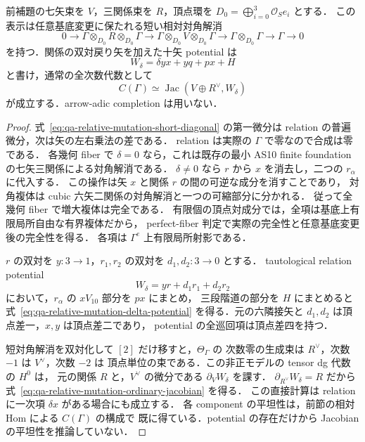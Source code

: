 \begin{proposition}
\label{prop:qa-relative-mutation-ordinary-jacobian}
前補題の七矢束を $V$，三関係束を $R$，頂点環を
$D_0=\bigoplus_{i=0}^3\mathcal O_Se_i$ とする．
この表示は任意基底変更に保たれる短い相対対角解消
\[
 0\longrightarrow\Gamma\otimes_{D_0}R\otimes_{D_0}\Gamma
 \longrightarrow\Gamma\otimes_{D_0}V\otimes_{D_0}\Gamma
 \longrightarrow\Gamma\otimes_{D_0}\Gamma
 \longrightarrow\Gamma\longrightarrow0
 \tag{MD}\label{eq:qa-relative-mutation-short-diagonal}
\]
を持つ．関係の双対戻り矢を加えた十矢 potential は
\[
 W_\delta=\delta yx+yq+px+H
 \tag{MP}\label{eq:qa-relative-mutation-delta-potential}
\]
と書け，通常の全次数代数として
\[
 C(\Gamma)\simeq\operatorname{Jac}(V\oplus R^\vee,W_\delta)
 \tag{MJ}\label{eq:qa-relative-mutation-ordinary-jacobian}
\]
が成立する．arrow-adic completion は用いない．
\end{proposition}
\begin{proof}
式~\eqref{eq:qa-relative-mutation-short-diagonal} の第一微分は
relation の普遍微分，次は矢の左右乗法の差である．
relation は実際の $\Gamma$ で零なので合成は零である．
各幾何 fiber で $\delta=0$ なら，これは既存の最小 AS10 finite foundation
の七矢三関係による対角解消である．
$\delta\ne0$ なら $r$ から $x$ を消去し，二つの $r_\alpha$ に代入する．
この操作は矢 $x$ と関係 $r$ の間の可逆な成分を消すことであり，
対角複体は cubic 六矢二関係の対角解消と一つの可縮部分に分かれる．
従って全幾何 fiber で増大複体は完全である．
有限個の頂点対成分では，全項は基底上有限局所自由な有界複体だから，
perfect-fiber 判定で実際の完全性と任意基底変更後の完全性を得る．
各項は $\Gamma^e$ 上有限局所射影である．

$r$ の双対を $y:3\to1$，$r_1,r_2$ の双対を $d_1,d_2:3\to0$ とする．
tautological relation potential
\[
 W_\delta=yr+d_1r_1+d_2r_2
\]
において，$r_\alpha$ の $xV_{10}$ 部分を $px$ にまとめ，
三段階道の部分を $H$ にまとめると式~\eqref{eq:qa-relative-mutation-delta-potential}
を得る．元の六隣接矢と $d_1,d_2$ は頂点差一，$x,y$ は頂点差二であり，
potential の全巡回項は頂点差四を持つ．

短対角解消を双対化して $[2]$ だけ移すと，$\Theta_\Gamma$ の
次数零の生成束は $R^\vee$，次数 $-1$ は $V^\vee$，次数 $-2$ は
頂点単位の束である．この非正モデルの tensor dg 代数の $H^0$ は，
元の関係 $R$ と，$V^\vee$ の微分である $\partial_VW_\delta$ を課す．
$\partial_{R^\vee}W_\delta=R$ だから
式~\eqref{eq:qa-relative-mutation-ordinary-jacobian} を得る．
この直接計算は relation に一次項 $\delta x$ がある場合にも成立する．
各 component の平坦性は，前節の相対 Hom による $C(\Gamma)$ の構成で
既に得ている．potential の存在だけから Jacobian の平坦性を推論していない．
\end{proof}

